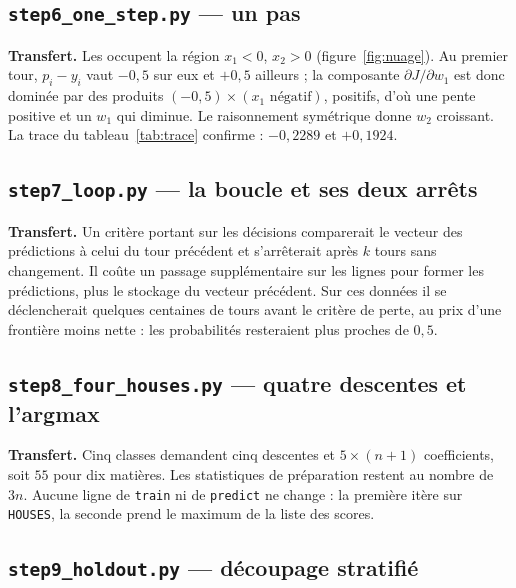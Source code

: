 \subsection*{\texttt{step6\_one\_step.py} --- un pas}


\textbf{Transfert.} Les \Gryf occupent la région $x_1<0$, $x_2>0$
(figure~\ref{fig:nuage}). Au premier tour, $p_i-y_i$ vaut $-0{,}5$ sur eux et
$+0{,}5$ ailleurs ; la composante $\partial J/\partial w_1$ est donc dominée par
des produits $(-0{,}5)\times(\text{$x_1$ négatif})$, positifs, d'où une pente
positive et un $w_1$ qui diminue. Le raisonnement symétrique donne $w_2$
croissant. La trace du tableau~\ref{tab:trace} confirme : $-0{,}2289$ et
$+0{,}1924$.

\subsection*{\texttt{step7\_loop.py} --- la boucle et ses deux arrêts}


\textbf{Transfert.} Un critère portant sur les décisions comparerait le vecteur
des prédictions à celui du tour précédent et s'arrêterait après $k$ tours sans
changement. Il coûte un passage supplémentaire sur les lignes pour former les
prédictions, plus le stockage du vecteur précédent. Sur ces données il se
déclencherait quelques centaines de tours avant le critère de perte, au prix
d'une frontière moins nette : les probabilités resteraient plus proches de
$0{,}5$.

\subsection*{\texttt{step8\_four\_houses.py} --- quatre descentes et l'argmax}


\textbf{Transfert.} Cinq classes demandent cinq descentes et
$5\times(n+1)$ coefficients, soit $55$ pour dix matières. Les statistiques de
préparation restent au nombre de $3n$. Aucune ligne de \texttt{train} ni de
\texttt{predict} ne change : la première itère sur \texttt{HOUSES}, la seconde
prend le maximum de la liste des scores.

\subsection*{\texttt{step9\_holdout.py} --- découpage stratifié}

